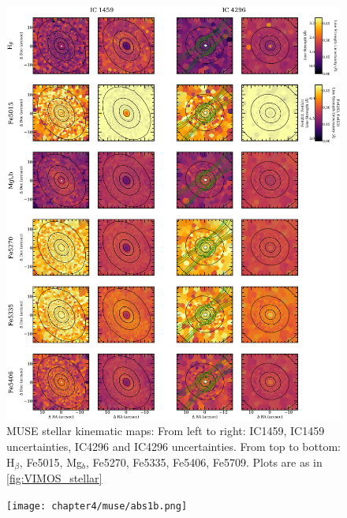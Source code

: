 		\begin{figure}
			\centering
			\includegraphics[height=0.94\textheight]{chapter4/muse/abs1.png}
			\caption[MUSE absorption line strength maps]{MUSE stellar kinematic maps: From left to right: IC1459, IC1459 uncertainties, IC4296 and IC4296 uncertainties. From top to bottom: H$_\beta$, Fe5015, Mg$_b$, Fe5270, Fe5335, Fe5406, Fe5709. Plots are as in \ref{fig:VIMOS_stellar}}
			\label{fig:MUSE_absorption}
		\end{figure}
		\begin{figure}
			\centering
			\texttt{[image: chapter4/muse/abs1b.png]}
		\end{figure}
